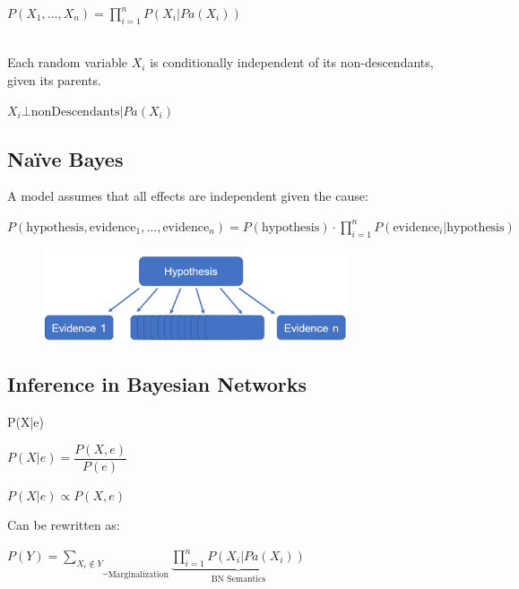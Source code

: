 \documentclass[
../../EiKI_Summary.tex,
]
{subfiles}
\begin{document}
\begin{csmb*}
    $\displaystyle P(X_1, \ldots, X_n) = \prod_{i=1}^{n} P(X_i | Pa(X_i))$
\end{csmb*}

\\
Each random variable $X_i$ is conditionally independent of its non-descendants, given its parents. 

\begin{csmb*}
    $X_i \bot \text{nonDescendants} | Pa(X_i)$
\end{csmb*}

\newpage
\subsection{Na\"ive Bayes }
A  model assumes that all effects are independent given the cause:

\begin{csmb*}
    $\displaystyle P(\text{hypothesis}, \text{evidence}_1, \ldots, \text{evidence}_n) = P(\text{hypothesis}) \cdot \prod_{i=1}^{n} P(\text{evidence}_i | \text{hypothesis})$
\end{csmb*}

\begin{figure}[H]
    \centering
    \includegraphics[width=0.8\textwidth]{Pics/09/NaiveBayesModel.png}
\end{figure}

\subsection{Inference in Bayesian Networks}

 P(X|e)

 $P(X|e) = \dfrac{P(X,e)}{P(e)}$

 $P(X|e) \propto P(X,e)$

Can be rewritten as:

\begin{csmb*}
    $\displaystyle P(Y) = \underbrace{\sum_{X_i \notin Y}}_{\text{Marginalization}} \underbrace{\prod_{i=1}^{n} P(X_i | Pa(X_i))}_{\text{BN Semantics}}$
\end{csmb*}
\end{document}
